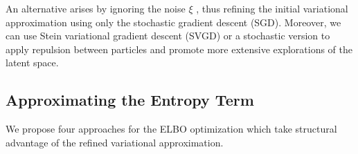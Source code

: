 An alternative arises by ignoring the noise $\xi$ \cite{mandt2017stochastic}, thus refining the initial variational approximation using only the stochastic gradient descent (SGD).
 Moreover, we can use Stein variational gradient descent (SVGD) \cite{liu2016stein} or a stochastic version \cite{gallego2018stochastic} to apply repulsion between particles and promote more extensive explorations of the latent space. %

\subsection{Approximating the Entropy Term}\label{sec:approx}

We propose four approaches for the ELBO optimization 
which take structural advantage of the refined variational approximation.

